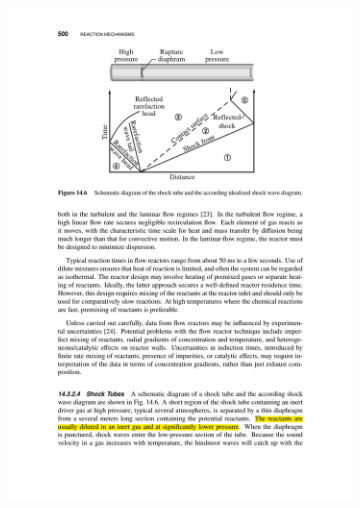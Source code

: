 \begin{figure}[!htbp]
	\centering
	\begin{subfigure}[t]{0.4\textwidth}
		\includegraphics[width=1\textwidth]{Figures/Results/Shocktube/schematics.pdf}
	\end{subfigure}
	\begin{subfigure}[t]{0.4\textwidth}

\end{subfigure}
\end{figure}
